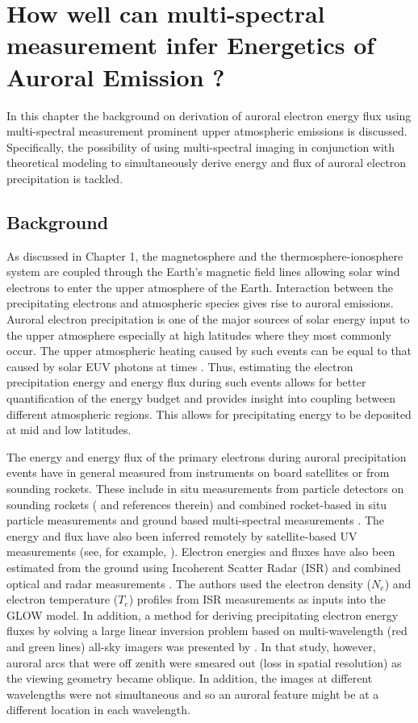 \documentclass[crop=false,class=mitthesis,oneside,font=12pt]{standalone}
\begin{document}
\chapter{How well can multi-spectral measurement infer Energetics of Auroral Emission ?} \label{chap:energy}

In this chapter the background on derivation of auroral electron energy flux using multi-spectral measurement prominent upper atmospheric emissions is discussed. Specifically, the possibility of using multi-spectral imaging in conjunction with theoretical modeling to simultaneously derive energy and flux of auroral electron precipitation is tackled. 

\section{Background}
As discussed in Chapter 1, the magnetosphere and the thermosphere-ionosphere system are coupled through the Earth's magnetic field lines allowing solar wind electrons to enter the upper atmosphere of the Earth. Interaction between the precipitating electrons and atmospheric species gives rise to auroral emissions. Auroral electron precipitation is one of the major sources of solar energy input to the upper atmosphere especially at high latitudes where they most commonly occur. The upper atmospheric heating caused by such events can be equal to that caused by solar EUV photons at times \citep{mayr_1978}. Thus, estimating the electron precipitation energy and energy flux during such events allows for better quantification of the energy budget and provides insight into coupling between different atmospheric regions. This allows for  precipitating energy to be deposited at mid and low latitudes.

The energy and energy flux of the primary electrons during auroral precipitation events have in general measured from instruments on board satellites or  from sounding rockets. These include in situ measurements from particle detectors on sounding rockets (\citet{rocket,michell_2016} and references therein) and combined rocket-based in situ particle measurements and ground based multi-spectral measurements \citep{grubbs_multi_spec}. The energy and flux have also been inferred remotely by satellite-based UV measurements (see, for example, \citet{guvi}).
Electron energies and fluxes have also been estimated from the ground using Incoherent Scatter Radar (ISR) \citep{semeter_2005} and combined optical and radar measurements \citep{pallamraju_2011}. The authors used the electron density ($N_e$) and electron temperature ($T_e$) profiles from ISR measurements as inputs into the GLOW model. In addition, a method for deriving precipitating electron energy fluxes by solving a large linear inversion problem based on multi-wavelength (red and green lines) all-sky imagers was presented by \citet{jan_rcons2001}. In that study, however, auroral arcs that were off zenith were smeared out (loss in spatial resolution) as the viewing geometry became oblique. In addition, the images at different wavelengths were not simultaneous and so an auroral feature might be at a different location in each wavelength.
\end{document}
